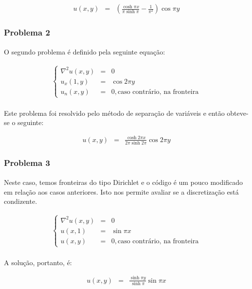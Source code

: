 \documentclass[validacao.tex]{subfiles}
\begin{document}
\begin{eqnarray}
u(x,y) & = & \left(\frac{\cosh \pi x}{\pi \sinh \pi} - \frac{1}{\pi^2}\right)\cos \pi y
\end{eqnarray}

\subsubsection{Problema 2}

\paragraph{} O segundo problema é definido pela seguinte equação:


\begin{eqnarray}
\left\{\begin{array}{ccl}
\nabla^2u(x,y) & = & 0\\
u_x(1,y) & = & \cos 2\pi y\\
u_n(x,y) & = & 0, \textrm{caso contrário, na fronteira}
\end{array}\right.
\end{eqnarray}

\paragraph{} Este problema foi resolvido pelo método de separação de variáveis e então obteve-se o seguinte:

\begin{eqnarray}
u(x,y) & = & \frac{\cosh 2\pi x}{2\pi \sinh 2\pi}\cos 2 \pi y
\end{eqnarray}


\subsubsection{Problema 3}
\paragraph{} Neste caso, temos fronteiras do tipo Dirichlet e o código é um pouco modificado em relação aos casos anteriores. Isto nos permite avaliar se a discretização está condizente.

\begin{eqnarray}
\left\{\begin{array}{ccl}
\nabla^2u(x,y) & = & 0\\
u(x,1) & = & \sin \pi x\\
u(x,y) & = & 0, \textrm{caso contrário, na fronteira}
\end{array}\right.
\end{eqnarray}

\paragraph{} A solução, portanto, é:

\begin{eqnarray}
u(x,y) & = & \frac{\sinh\pi y}{\sinh\pi} \sin\pi x
\end{eqnarray}
\end{document}

